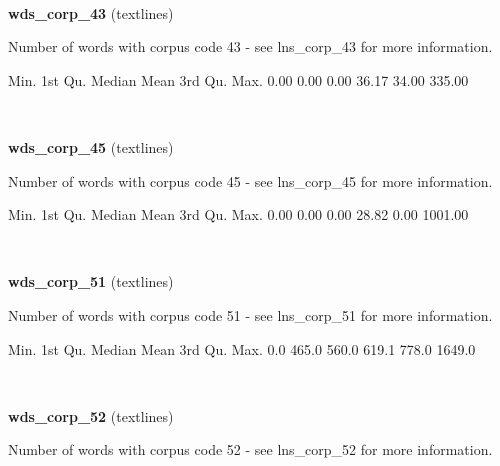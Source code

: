 \documentclass[]{article}
\newenvironment{Shaded}{\begin{snugshade}}{\end{snugshade}}
\newcommand{\FloatTok}[1]{\textcolor[rgb]{0.00,0.00,0.81}{{#1}}}
\newcommand{\NormalTok}[1]{{#1}}
\begin{document}
~

\vspace{1em}

\textbf{wds\_corp\_43} (textlines)

Number of words with corpus code 43 - see lns\_corp\_43 for more
information.

\begin{Shaded}
\begin{Highlighting}[]
   \NormalTok{Min. 1st Qu.  Median    Mean 3rd Qu.    Max. }
   \FloatTok{0.00}    \FloatTok{0.00}    \FloatTok{0.00}   \FloatTok{36.17}   \FloatTok{34.00}  \FloatTok{335.00} 
\end{Highlighting}
\end{Shaded}

~

\vspace{1em}

\textbf{wds\_corp\_45} (textlines)

Number of words with corpus code 45 - see lns\_corp\_45 for more
information.

\begin{Shaded}
\begin{Highlighting}[]
   \NormalTok{Min. 1st Qu.  Median    Mean 3rd Qu.    Max. }
   \FloatTok{0.00}    \FloatTok{0.00}    \FloatTok{0.00}   \FloatTok{28.82}    \FloatTok{0.00} \FloatTok{1001.00} 
\end{Highlighting}
\end{Shaded}

~

\vspace{1em}

\textbf{wds\_corp\_51} (textlines)

Number of words with corpus code 51 - see lns\_corp\_51 for more
information.

\begin{Shaded}
\begin{Highlighting}[]
   \NormalTok{Min. 1st Qu.  Median    Mean 3rd Qu.    Max. }
    \FloatTok{0.0}   \FloatTok{465.0}   \FloatTok{560.0}   \FloatTok{619.1}   \FloatTok{778.0}  \FloatTok{1649.0} 
\end{Highlighting}
\end{Shaded}

~

\vspace{1em}

\textbf{wds\_corp\_52} (textlines)

Number of words with corpus code 52 - see lns\_corp\_52 for more
information.
\end{document}
